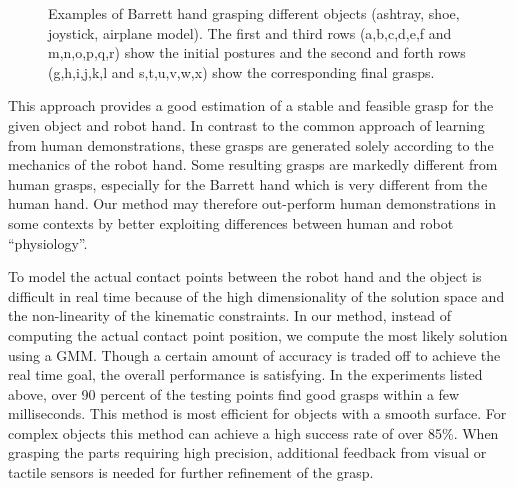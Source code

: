 \begin{figure}

  \caption{\scriptsize{Examples of Barrett hand grasping different objects (ashtray, shoe, joystick, airplane model). The first and third rows (a,b,c,d,e,f and m,n,o,p,q,r) show the initial postures and the second and forth rows (g,h,i,j,k,l and s,t,u,v,w,x) show the corresponding final grasps.}
}
    \label{barrett2}
\end{figure}



This approach provides a good estimation of a stable and feasible grasp for the given object and robot hand. In contrast to the common approach of learning from human demonstrations, these grasps are generated solely according to the mechanics of the robot hand. Some resulting grasps are markedly different from  human grasps, especially for the Barrett hand which is very different from the human hand. Our method may therefore out-perform human demonstrations in some contexts by better exploiting differences between human and robot ``physiology''.

To model the actual contact points between the robot hand and the object is difficult in real time because of the high dimensionality of the solution space and the non-linearity of the kinematic constraints. In our method, instead of computing the actual contact point position, we compute the most likely solution using a GMM. Though a certain amount of accuracy is traded off to achieve the real time goal, the overall performance is satisfying. In the experiments listed above, over 90 percent of the testing points find good grasps within a few milliseconds. This method is most efficient for objects with a smooth surface. For complex objects this method can achieve a high success rate of over 85\%. When grasping the parts requiring high precision, additional feedback from visual or tactile sensors is needed for further refinement of the grasp.

